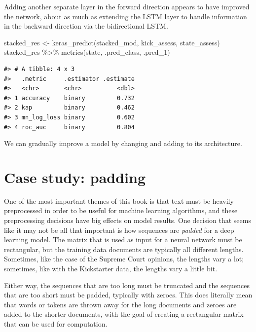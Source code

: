 \documentclass[
]{krantz}
\makeatletter
\newenvironment{Shaded}{\begin{snugshade}}{\end{snugshade}}
\newcommand{\FunctionTok}[1]{\textcolor[rgb]{0.00,0.00,0.00}{#1}}
\newcommand{\NormalTok}[1]{#1}
\newcommand{\OtherTok}[1]{\textcolor[rgb]{0.56,0.35,0.01}{#1}}
\newcommand{\SpecialCharTok}[1]{\textcolor[rgb]{0.00,0.00,0.00}{#1}}
\newenvironment{kframe}{%
\medskip{}
\setlength{\fboxsep}{.8em}
 \def\at@end@of@kframe{}%
 \ifinner\ifhmode%
  \def\at@end@of@kframe{\end{minipage}}%
  \begin{minipage}{\columnwidth}%
 \fi\fi%
 \def\FrameCommand##1{\hskip\@totalleftmargin \hskip-\fboxsep
 \colorbox{shadecolor}{##1}\hskip-\fboxsep
     \hskip-\linewidth \hskip-\@totalleftmargin \hskip\columnwidth}%
 \MakeFramed {\advance\hsize-\width
   \@totalleftmargin\z@ \linewidth\hsize
   \@setminipage}}%
 {\par\unskip\endMakeFramed%
 \at@end@of@kframe}
\renewenvironment{Shaded}{\begin{kframe}}{\end{kframe}}
\makeatother
\begin{document}
Adding another separate layer in the forward direction appears to have improved the network, about as much as extending the LSTM layer to handle information in the backward direction via the bidirectional LSTM.

\begin{Shaded}
\begin{Highlighting}[]
\NormalTok{stacked\_res }\OtherTok{\textless{}{-}} \FunctionTok{keras\_predict}\NormalTok{(stacked\_mod, kick\_assess, state\_assess)}
\NormalTok{stacked\_res }\SpecialCharTok{\%\textgreater{}\%} \FunctionTok{metrics}\NormalTok{(state, .pred\_class, .pred\_1)}
\end{Highlighting}
\end{Shaded}

\begin{verbatim}
#> # A tibble: 4 x 3
#>   .metric     .estimator .estimate
#>   <chr>       <chr>          <dbl>
#> 1 accuracy    binary         0.732
#> 2 kap         binary         0.462
#> 3 mn_log_loss binary         0.602
#> 4 roc_auc     binary         0.804
\end{verbatim}

We can gradually improve a model by changing and adding to its architecture.

\hypertarget{lstmpadding}{%
\section{Case study: padding}\label{lstmpadding}}

One of the most important themes of this book is that text must be heavily preprocessed in order to be useful for machine learning algorithms, and these preprocessing decisions have big effects on model results. One decision that seems like it may not be all that important is how sequences are \emph{padded} for a deep learning model. The matrix that is used as input for a neural network must be rectangular, but the training data documents are typically all different lengths. Sometimes, like the case of the Supreme Court opinions, the lengths vary a lot; sometimes, like with the Kickstarter data, the lengths vary a little bit.

Either way, the sequences that are too long must be truncated and the sequences that are too short must be padded, typically with zeroes. This does literally mean that words or tokens are thrown away for the long documents and zeroes are added to the shorter documents, with the goal of creating a rectangular matrix that can be used for computation.
\end{document}

